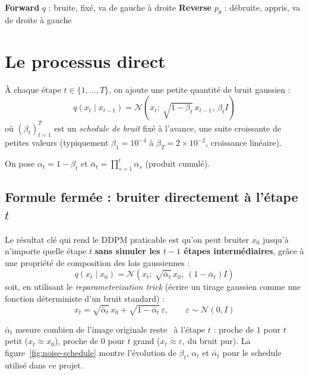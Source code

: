 \begin{center}
{\color{blue!60!black}\textbf{Forward} $q$ : bruite, fixé, va de gauche à droite} \qquad
{\color{red!70!black}\textbf{Reverse} $p_\theta$ : débruite, appris, va de droite à gauche}
\end{center}

\section{Le processus direct}

À chaque étape $t \in \{1, \dots, T\}$, on ajoute une petite quantité de bruit gaussien :
\begin{equation}
    q(x_t \mid x_{t-1}) = \mathcal{N}\!\left(x_t;\ \sqrt{1-\beta_t}\, x_{t-1},\ \beta_t I\right)
\end{equation}
où $(\beta_t)_{t=1}^T$ est un \emph{schedule de bruit} fixé à l'avance, une suite croissante de petites
valeurs (typiquement $\beta_1 = 10^{-4}$ à $\beta_T = 2 \times 10^{-2}$, croissance linéaire).

\begin{definition}
On pose $\alpha_t = 1 - \beta_t$ et $\bar\alpha_t = \prod_{s=1}^t \alpha_s$ (produit cumulé).
\end{definition}

\subsection{Formule fermée : bruiter directement à l'étape $t$}

Le résultat clé qui rend le DDPM praticable est qu'on peut bruiter $x_0$ jusqu'à n'importe quelle étape
$t$ \textbf{sans simuler les $t-1$ étapes intermédiaires}, grâce à une propriété de composition des
lois gaussiennes :
\begin{equation}
    \boxed{q(x_t \mid x_0) = \mathcal{N}\!\left(x_t;\ \sqrt{\bar\alpha_t}\, x_0,\ (1-\bar\alpha_t) I\right)}
\end{equation}
soit, en utilisant le \emph{reparameterization trick} (écrire un tirage gaussien comme une fonction
déterministe d'un bruit standard) :
\begin{equation}
    \label{eq:qsample}
    x_t = \sqrt{\bar\alpha_t}\, x_0 + \sqrt{1-\bar\alpha_t}\, \varepsilon, \qquad \varepsilon \sim \mathcal{N}(0, I)
\end{equation}

\begin{intuition}
$\bar\alpha_t$ mesure \og combien de l'image originale reste \fg\ à l'étape $t$ : proche de $1$ pour
$t$ petit ($x_t \approx x_0$), proche de $0$ pour $t$ grand ($x_t \approx \varepsilon$, du bruit pur).
La figure~\ref{fig:noise-schedule} montre l'évolution de $\beta_t$, $\alpha_t$ et $\bar\alpha_t$ pour
le schedule utilisé dans ce projet.
\end{intuition}

